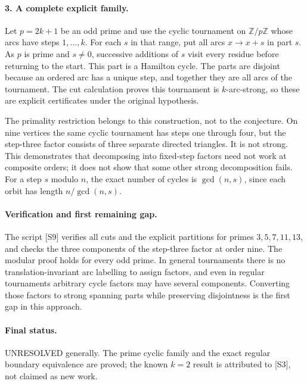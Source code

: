 \documentclass[11pt,a4paper]{article}
\begin{document}
\paragraph{3. A complete explicit family.}
Let $p=2k+1$ be an odd prime and use the cyclic tournament on
$\mathbb Z/p\mathbb Z$ whose arcs have steps $1,\ldots,k$.
For each $s$ in that range, put all arcs $x\to x+s$ in part $s$.
As $p$ is prime and $s\ne0$, successive additions of $s$ visit
every residue before returning to the start. This part is a
Hamilton cycle. The parts are disjoint because an ordered arc has
a unique step, and together they are all arcs of the tournament.
The cut calculation proves this tournament is $k$-arc-strong, so
these are explicit certificates under the original hypothesis.

The primality restriction belongs to this construction, not to the
conjecture. On nine vertices the same cyclic tournament has steps
one through four, but the step-three factor consists of three
separate directed triangles. It is not strong. This demonstrates
that decomposing into fixed-step factors need not work at composite
orders; it does not show that some other strong decomposition fails.
For a step $s$ modulo $n$, the exact number of cycles is
$\gcd(n,s)$, since each orbit has length $n/\gcd(n,s)$.

\paragraph{Verification and first remaining gap.}
The script [S9] verifies all cuts and the explicit partitions
for primes $3,5,7,11,13$, and checks the three components of the
step-three factor at order nine. The modular proof holds for every
odd prime. In general tournaments there is no translation-invariant
arc labelling to assign factors, and even in regular tournaments
arbitrary cycle factors may have several components. Converting
those factors to strong spanning parts while preserving disjointness
is the first gap in this approach.

\paragraph{Final status.}
UNRESOLVED generally. The prime cyclic family and the exact regular
boundary equivalence are proved; the known $k=2$ result is attributed
to [S3], not claimed as new work.
\end{document}
